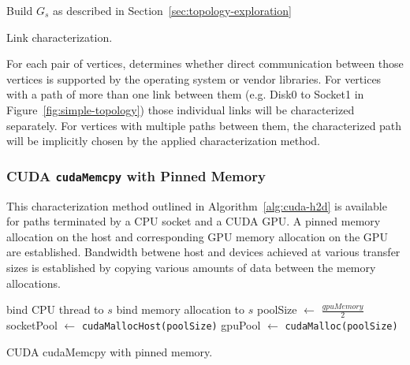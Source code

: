 \begin{algorithm}[ht]
    \SetAlgoLined
     Build $G_s$ as described in Section~\ref{sec:topology-exploration}\;
     \caption{Link characterization.}
     \label{alg:link-char}
\end{algorithm}

For each pair of vertices,  determines whether direct communication between those vertices is supported by the operating system or vendor libraries.
For vertices with a path of more than one link between them (e.g. Disk0 to Socket1 in Figure~\ref{fig:simple-topology}) those individual links will be characterized separately.
For vertices with multiple paths between them, the characterized path will be implicitly chosen by the applied characterization method.

\subsubsection{CUDA \texttt{cudaMemcpy} with Pinned Memory}

This characterization method outlined in Algorithm~\ref{alg:cuda-h2d} is available for paths terminated by a CPU socket and a CUDA GPU.
A pinned memory allocation on the host and corresponding GPU memory allocation on the GPU are established.
Bandwidth betwene host and devices achieved at various transfer sizes is established by copying various amounts of data between the memory allocations.

\begin{algorithm}[ht]
    \SetAlgoLined
    bind CPU thread to $s$\;
    bind memory allocation to $s$\;
    poolSize $\gets$ $\frac{gpuMemory}{2}$\;
    socketPool $\gets$ \texttt{cudaMallocHost(poolSize)}\;
    gpuPool $\gets$ \texttt{cudaMalloc(poolSize)}\;
    \caption{CUDA cudaMemcpy with pinned memory.}
    \label{alg:cuda-h2d}
\end{algorithm}


